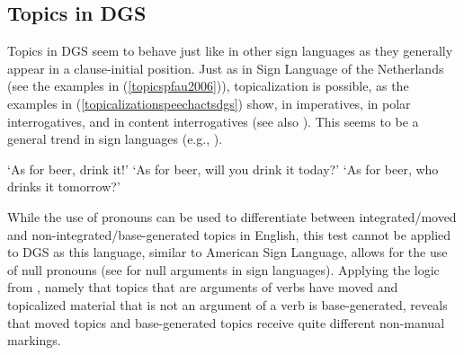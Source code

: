 \subsection{Topics in DGS}\label{topicsindgssection}

Topics in DGS seem to behave just like in other sign languages as they generally appear in a clause-initial position. Just as in Sign Language of the Netherlands (see the examples in (\ref{topicspfau2006})), topicalization is possible, as the examples in (\ref{topicalizationspeechactsdgs}) show, in imperatives, in polar interrogatives, and in content interrogatives  (see also \citealt[391]{happ2014vork}). This seems to be a general trend in sign languages (e.g., \citealt[24]{zeshan2004interrogative}).

\begin{exe}
\ex\label{topicalizationspeechactsdgs}\begin{xlist}
\ex {} 
\glt `As for beer, drink it!' \label{topicalizationspeechactsdgsa}
\ex {} 
%
\glt `As for beer, will you drink it today?' \label{topicalizationspeechactsdgsb}
\ex {} 
\glt `As for beer, who drinks it tomorrow?' \label{topicalizationspeechactsdgsc}
\end{xlist}
\end{exe}

\noindent While the use of pronouns can be used to differentiate between integrated/moved and non-integrated/base-generated topics in English, this test cannot be applied to DGS as this language, similar to American Sign Language, allows for the use of null pronouns (see \citealt{lillo1986two} for null arguments in sign languages). Applying the logic from \citet{aarons1994aspects}, namely that topics that are arguments of verbs have moved and topicalized material that is not an argument of a verb is base-generated, reveals that moved topics and base-generated topics receive quite different non-manual markings.

